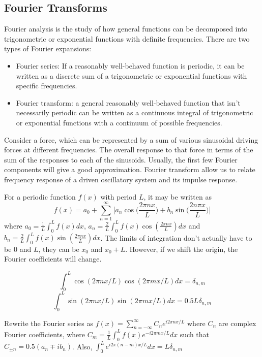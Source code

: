 \documentclass[a4paper]{article}
\begin{document}
\subsection{Fourier Transforms}
\begin{Note}
Fourier analysis is the study of how general functions can be decomposed into trigonometric or exponential functions with definite frequencies. There are two types of Fourier expansions:
\begin{itemize}
    \item Fourier series: If a reasonably well-behaved function is periodic, it can be written as a discrete sum of a trigonometric or exponential functions with specific frequencies.
    \item Fourier transform: a general reasonably well-behaved function that isn't necessarily periodic can be written as a continuous integral of trigonometric or exponential functions with a continuum of possible frequencies.
\end{itemize}
Consider a force, which can be represented by a sum of various sinusoidal driving forces at different frequencies. The overall response to that force in terms of the sum of the responses to each of the sinusoids. Usually, the first few Fourier components will give a good approximation. Fourier transform allow us to relate frequency response of a driven oscillatory system and its impulse response.
\end{Note}
\begin{defi}
For a periodic function $f(x)$ with period $L$, it may be written as
$$f(x)=a_0+\sum_{n=1}^\infty\bigg[a_n\cos\bigg(\frac{2\pi nx}{L}\bigg)+b_n\sin\bigg(\frac{2n\pi x}{L}\bigg)\bigg]$$
where $a_0=\frac{1}{L}\int_0^Lf(x)dx$, $a_n=\frac{2}{L}\int_0^Lf(x)\cos(\frac{2\pi nx}{L})dx$ and $b_n=\frac{2}{L}\int_0^Lf(x)\sin(\frac{2\pi nx}{L})dx$. The limits of integration don't actually have to be 0 and $L$, they can be $x_0$ and $x_0+L$. However, if we shift the origin, the Fourier coefficients will change.
\end{defi}
\begin{eg}
$$\int_0^L\cos(2\pi nx/L)\cos(2\pi mx/L)dx=\delta_{n,m}$$
$$\int_0^L\sin(2\pi nx/L)\sin(2\pi mx/L)dx=0.5L\delta_{n,m}$$
\end{eg}
\begin{defi}
Rewrite the Fourier series as $f(x)=\sum_{n=-\infty}^\infty C_ne^{i2\pi nx/L}$ where $C_n$ are complex Fourier coefficients, where $C_m=\frac{1}{L}\int_0^Lf(x)e^{-i2\pi mx/L}dx$ such that $C_{\pm n}=0.5(a_n\mp ib_n)$. Also, $\int_0^Le^{i2\pi (n-m)x/L}dx=L\delta_{n,m}$
\end{defi}
\end{document}
